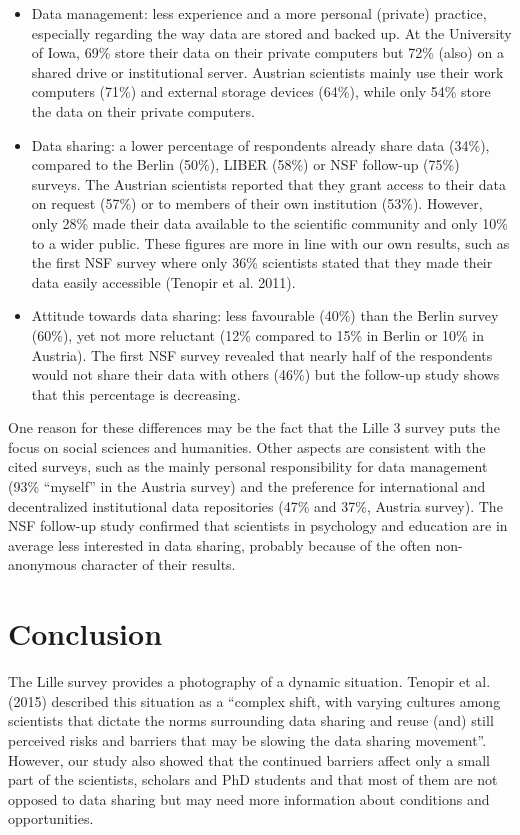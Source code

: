 \documentclass[a4paper,
fontsize=11pt,
oneside,
numbers=noperiodatend,
parskip=half-,
bibliography=totoc,
final
]{scrartcl}
\begin{document}
\begin{itemize}
\item
  Data management: less experience and a more personal (private)
  practice, especially regarding the way data are stored and backed up.
  At the University of Iowa, 69\% store their data on their private
  computers but 72\% (also) on a shared drive or institutional server.
  Austrian scientists mainly use their work computers (71\%) and
  external storage devices (64\%), while only 54\% store the data on
  their private computers.
\item
  Data sharing: a lower percentage of respondents already share data
  (34\%), compared to the Berlin (50\%), LIBER (58\%) or NSF follow-up
  (75\%) surveys. The Austrian scientists reported that they grant
  access to their data on request (57\%) or to members of their own
  institution (53\%). However, only 28\% made their data available to
  the scientific community and only 10\% to a wider public. These
  figures are more in line with our own results, such as the first NSF
  survey where only 36\% scientists stated that they made their data
  easily accessible (Tenopir et al. 2011).
\item
  Attitude towards data sharing: less favourable (40\%) than the Berlin
  survey (60\%), yet not more reluctant (12\% compared to 15\% in Berlin
  or 10\% in Austria). The first NSF survey revealed that nearly half of
  the respondents would not share their data with others (46\%) but the
  follow-up study shows that this percentage is decreasing.
\end{itemize}

One reason for these differences may be the fact that the Lille 3 survey
puts the focus on social sciences and humanities. Other aspects are
consistent with the cited surveys, such as the mainly personal
responsibility for data management (93\% \enquote{myself} in the Austria
survey) and the preference for international and decentralized
institutional data repositories (47\% and 37\%, Austria survey). The NSF
follow-up study confirmed that scientists in psychology and education
are in average less interested in data sharing, probably because of the
often non-anonymous character of their results.

\section*{Conclusion}\label{conclusion}

The Lille survey provides a photography of a dynamic situation. Tenopir
et al. (2015) described this situation as a \enquote{complex shift, with
varying cultures among scientists that dictate the norms surrounding
data sharing and reuse (and) still perceived risks and barriers that may
be slowing the data sharing movement}. However, our study also showed
that the continued barriers affect only a small part of the scientists,
scholars and PhD students and that most of them are not opposed to data
sharing but may need more information about conditions and
opportunities.
\end{document}
